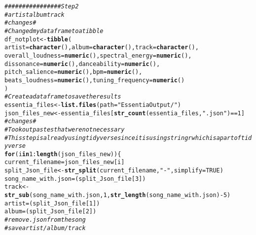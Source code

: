 \documentclass{article}\usepackage[]{graphicx}\usepackage[]{xcolor}
\makeatletter
\newcommand{\hlnum}[1]{\textcolor[rgb]{0.686,0.059,0.569}{#1}}%
\newcommand{\hlsng}[1]{\textcolor[rgb]{0.192,0.494,0.8}{#1}}%
\newcommand{\hlcom}[1]{\textcolor[rgb]{0.678,0.584,0.686}{\textit{#1}}}%
\newcommand{\hlopt}[1]{\textcolor[rgb]{0,0,0}{#1}}%
\newcommand{\hldef}[1]{\textcolor[rgb]{0.345,0.345,0.345}{#1}}%
\newcommand{\hlkwa}[1]{\textcolor[rgb]{0.161,0.373,0.58}{\textbf{#1}}}%
\newcommand{\hlkwb}[1]{\textcolor[rgb]{0.69,0.353,0.396}{#1}}%
\newcommand{\hlkwc}[1]{\textcolor[rgb]{0.333,0.667,0.333}{#1}}%
\newcommand{\hlkwd}[1]{\textcolor[rgb]{0.737,0.353,0.396}{\textbf{#1}}}%
\newenvironment{kframe}{%
 \def\at@end@of@kframe{}%
 \ifinner\ifhmode%
  \def\at@end@of@kframe{\end{minipage}}%
  \begin{minipage}{\columnwidth}%
 \fi\fi%
 \def\FrameCommand##1{\hskip\@totalleftmargin \hskip-\fboxsep
 \colorbox{shadecolor}{##1}\hskip-\fboxsep
     \hskip-\linewidth \hskip-\@totalleftmargin \hskip\columnwidth}%
 \MakeFramed {\advance\hsize-\width
   \@totalleftmargin\z@ \linewidth\hsize
   \@setminipage}}%
 {\par\unskip\endMakeFramed%
 \at@end@of@kframe}
\newenvironment{knitrout}{}{} %
\makeatother
\begin{document}
\begin{enumerate}
\begin{knitrout}
\begin{kframe}
\begin{alltt}
\hlcom{################ Step 2}
\hlcom{# artist album track}
\hlcom{#changes#}
\hlcom{#Changed my data frame to a tibble}
\hldef{df_notplot} \hlkwb{<-} \hlkwd{tibble}\hldef{(}
  \hlkwc{artist} \hldef{=} \hlkwd{character}\hldef{(),} \hlkwc{album} \hldef{=} \hlkwd{character}\hldef{(),} \hlkwc{track} \hldef{=} \hlkwd{character}\hldef{(),}
  \hlkwc{overall_loudness} \hldef{=} \hlkwd{numeric}\hldef{(),} \hlkwc{spectral_energy} \hldef{=} \hlkwd{numeric}\hldef{(),}
  \hlkwc{dissonance} \hldef{=} \hlkwd{numeric}\hldef{(),} \hlkwc{danceability} \hldef{=} \hlkwd{numeric}\hldef{(),}
  \hlkwc{pitch_salience} \hldef{=} \hlkwd{numeric}\hldef{(),} \hlkwc{bpm} \hldef{=} \hlkwd{numeric}\hldef{(),}
  \hlkwc{beats_loudness} \hldef{=} \hlkwd{numeric}\hldef{(),} \hlkwc{tuning_frequency} \hldef{=} \hlkwd{numeric}\hldef{()}
\hldef{)}
\hlcom{# Create a data frame to save the results}
\hldef{essentia_files} \hlkwb{<-} \hlkwd{list.files}\hldef{(}\hlkwc{path} \hldef{=} \hlsng{"EssentiaOutput/"}\hldef{)}
\hldef{json_files_new} \hlkwb{<-} \hldef{essentia_files[}\hlkwd{str_count}\hldef{(essentia_files,} \hlsng{".json"}\hldef{)}\hlopt{==}\hlnum{1}\hldef{]}
\hlcom{#changes#}
\hlcom{#Took out pastes that were not necessary}
\hlcom{#This step is already using tidyverse since it is using stringr which is a part of tidyverse}
\hlkwa{for} \hldef{(i} \hlkwa{in} \hlnum{1}\hlopt{:}\hlkwd{length}\hldef{(json_files_new)) \{}
  \hldef{current_filename} \hlkwb{=} \hldef{json_files_new[i]}
  \hldef{split_Json_file} \hlkwb{<-} \hlkwd{str_split}\hldef{(current_filename,} \hlsng{"-"}\hldef{,} \hlkwc{simplify} \hldef{=} \hlnum{TRUE}\hldef{)}
  \hldef{song_name_with.json} \hlkwb{=} \hldef{(split_Json_file[}\hlnum{3}\hldef{])}
  \hldef{track} \hlkwb{<-} \hlkwd{str_sub}\hldef{(song_name_with.json,} \hlnum{1}\hldef{,} \hlkwd{str_length}\hldef{(song_name_with.json)} \hlopt{-} \hlnum{5}\hldef{)}
  \hldef{artist} \hlkwb{=} \hldef{(split_Json_file[}\hlnum{1}\hldef{])}
  \hldef{album} \hlkwb{=} \hldef{(split_Json_file[}\hlnum{2}\hldef{])}
  \hlcom{# remove .json from the song}
  \hlcom{# save artist/album/track}




\end{alltt}
\end{kframe}
\end{knitrout}
\end{enumerate}
\end{document}
